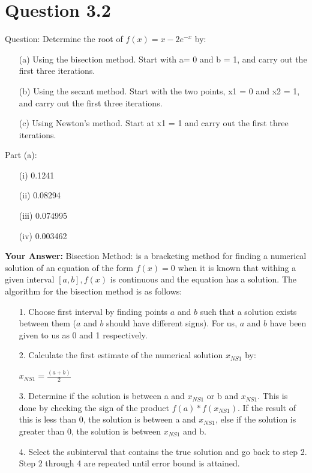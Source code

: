 \documentclass[12pt]{report}
\begin{document}
\section{Question 3.2}
Question: Determine the root of $f(x) = x - 2e^{-x}$ by: 
\begin{itemize}
\item[(a)] Using the bisection method. Start with a= 0 and  b = 1, and carry out the first three iterations.
\item[(b)] Using the secant method. Start with the two points, x1 = 0 and x2 = 1, and carry out the first three iter­ations. 
\item[(c)] Using Newton's method. Start at x1 = 1 and carry out the first three iterations. 
\end{itemize}
Part (a):
\begin{itemize}
\item[(i)] 0.1241
\item[(ii)] 0.08294
\item[(iii)] 0.074995
\item[(iv)] 0.003462
\end{itemize}
\textbf{Your Answer:}
\newline
Bisection Method: is a bracketing method for finding a numerical solution of an equation of the form $f(x) = 0$ when it is known that withing a given interval $[a,b], f(x)$ is continuous and the equation has a solution.
\newline
The algorithm for the bisection method is as follows:
\begin{itemize}
\item[1.] Choose first interval by finding points $a$ and $b$ such that a solution exists between them ($a$ and $b$ should have different signs). For us, $a$ and $b$ have been given to us as 0 and 1 respectively.
\item[2.] Calculate the first estimate of the numerical solution $x_{NS1}$ by:
\begin{center}
$x_{NS1} = \frac{(a+b)}{2}$
\end{center}
\item[3.] Determine if the solution is between a and $x_{NS1}$ or b and $x_{NS1}$. This is done by checking the sign of the product $f(a) * f(x_{NS1})$. If the result of this is less than 0, the solution is between a and $x_{NS1}$, else if the solution is greater than 0, the solution is between $x_{NS1}$ and b.
\item[4.] Select the subinterval that contains the true solution and go back to step 2. Step 2 through 4 are repeated until error bound is attained.
\end{itemize}
\end{document}
